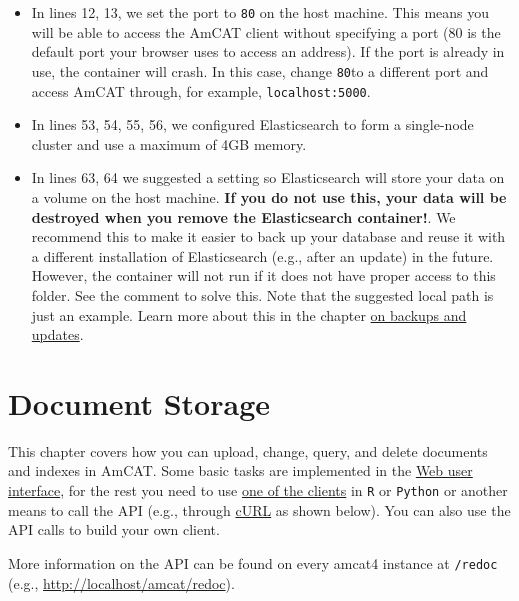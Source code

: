 \documentclass[
  letterpaper,
  DIV=11,
  numbers=noendperiod]{scrreprt}
\providecommand{\tightlist}{%
  \setlength{\itemsep}{0pt}\setlength{\parskip}{0pt}}\usepackage{longtable,booktabs,array}
\begin{document}
\begin{tcolorbox}
\begin{itemize}
\tightlist
\item
  In lines 12, 13, we set the port to \texttt{80} on the host machine.
  This means you will be able to access the AmCAT client without
  specifying a port (80 is the default port your browser uses to access
  an address). If the port is already in use, the container will crash.
  In this case, change \texttt{80}to a different port and access AmCAT
  through, for example, \texttt{localhost:5000}.
\item
  In lines 53, 54, 55, 56, we configured Elasticsearch to form a
  single-node cluster and use a maximum of 4GB memory.
\item
  In lines 63, 64 we suggested a setting so Elasticsearch will store
  your data on a volume on the host machine. \textbf{If you do not use
  this, your data will be destroyed when you remove the Elasticsearch
  container!}. We recommend this to make it easier to back up your
  database and reuse it with a different installation of Elasticsearch
  (e.g., after an update) in the future. However, the container will not
  run if it does not have proper access to this folder. See the comment
  to solve this. Note that the suggested local path is just an example.
  Learn more about this in the chapter
  \hyperref[backupux2c-restore-and-update-amcat]{on backups and
  updates}.
\end{itemize}

\end{tcolorbox}


\chapter{Document Storage}\label{document-storage}

This chapter covers how you can upload, change, query, and delete
documents and indexes in AmCAT. Some basic tasks are implemented in the
\hyperref[manage-documents-with-a-client]{Web user interface}, for the
rest you need to use \hyperref[manage-documents-with-a-client]{one of
the clients} in \texttt{R} or \texttt{Python} or another means to call
the API (e.g., through \href{https://en.wikipedia.org/wiki/CURL}{cURL}
as shown below). You can also use the API calls to build your own
client.

More information on the API can be found on every amcat4 instance at
\texttt{/redoc} (e.g., \url{http://localhost/amcat/redoc}).
\end{document}
